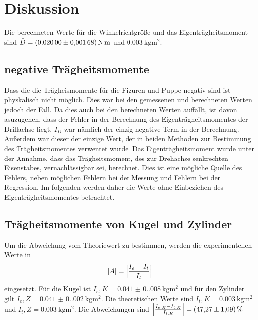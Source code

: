 \section{Diskussion}
\label{sec:Diskussion}

    Die berechneten Werte für die Winkelrichtgröße und das Eigenträgheitsmoment sind $\bar{D}=\qty{0,02(0,00168)}{\newton\meter}$ und  $\qty{0,003}{\kilo\gram\meter\squared}$. 

    \subsection{negative Trägheitsmomente}
    Dass die die Trägheismomente für die Figuren und Puppe negativ sind ist physkalisch nicht möglich.
    Dies war bei den gemessenen und berechneten Werten jedoch der Fall.
    Da dies auch bei den berechneten Werten auffällt, ist davon asuzugehen, dass der Fehler in der Berechnung des Eigenträgheitsmomentes der Drillachse liegt.
    $I_D$ war nämlich der einzig negative Term in der Berechnung.
    Außerdem war dieser der einzige Wert, der in beiden Methoden zur Bestimmung des Trägheitsmomentes verwentet wurde.
    Das Eigenträgheitsmoment wurde unter der Annahme, dass das Trägheitsmoment, des zur Drehachse senkrechten Eisenstabes, vernachlässigbar sei, berechnet.
    Dies ist eine mögliche Quelle des Fehlers, neben möglichen Fehlern bei der Messung und Fehlern bei der Regression.
    Im folgenden werden daher die Werte ohne Einbeziehen des Eigenträgheitsmomentes betrachtet.

    \subsection{Trägheitsmomente von Kugel und Zylinder}
    Um die Abweichung vom Theoriewert zu bestimmen, werden die experimentellen Werte in
    \begin{equation}
        |A|=\Bigl|\frac{I_e-I_t}{I_t}\Bigr|
        \label{eqn:abweichung}
    \end{equation}
    eingesetzt.
    Für die Kugel ist $I_e,K=\qty{0.041(0.008)}{\kilo\gram\meter\squared}$ und für den Zylinder gilt $I_e,Z=\qty{0.041(0.002)}{\kilo\gram\meter\squared}$.
    Die theoretischen Werte sind $I_t,K=\qty{0.003}{\kilo\gram\meter\squared}$ und $I_t,Z=\qty{0.003}{\kilo\gram\meter\squared}$.
    Die Abweichungen sind $\Bigl|\frac{I_{e,K}-I_{t,K}}{I_{t,K}}\Bigr|=\qty{47.27(1.09)}{\percent}$


